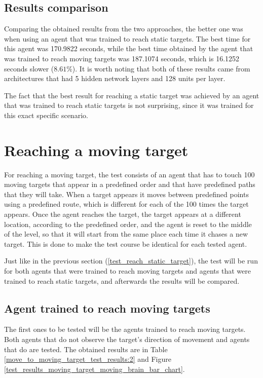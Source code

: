 \subsection{Results comparison}
Comparing the obtained results from the two approaches, the better one was when using an agent that was trained to reach static targets. The best time for this agent was 170.9822 seconds, while the best time obtained by the agent that was trained to reach moving targets was 187.1074 seconds, which is 16.1252 seconds slower ($8.61\%$). It is worth noting that both of these results came from architectures that had 5 hidden network layers and 128 units per layer.

The fact that the best result for reaching a static target was achieved by an agent that was trained to reach static targets is not surprising, since it was trained for this exact specific scenario.



\section{Reaching a moving target} \label{test_reach_moving_target}

For reaching a moving target, the test consists of an agent that has to touch 100 moving targets that appear in a predefined order and that have predefined paths that they will take. When a target appears it moves between predefined points using a predefined route, which is different for each of the 100 times the target appears. Once the agent reaches the target, the target appears at a different location, according to the predefined order, and the agent is reset to the middle of the level, so that it will start from the same place each time it chases a new target. This is done to make the test course be identical for each tested agent.

Just like in the previous section (\ref{test_reach_static_target}), the test will be run for both agents that were trained to reach moving targets and agents that were trained to reach static targets, and afterwards the results will be compared.


\subsection{Agent trained to reach moving targets}

The first ones to be tested will be the agents trained to reach moving targets. Both agents that do not observe the target's direction of movement and agents that do are tested. The obtained results are in Table \ref{move_to_moving_target_test_results:2} and Figure \ref{test_results_moving_target_moving_brain_bar_chart}. 

